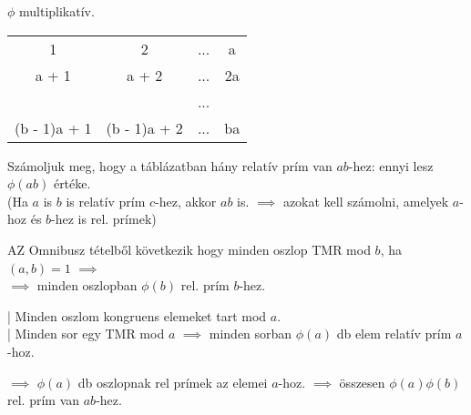 \begin{frame}
  \begin{tcolorbox}[title={Tétel: $\phi$ multiplikativitása}]
  $\phi$ multiplikatív.
  \tcblower
    \mmedskip

    \begin{tabular}{c c c c}
    1 & 2 & ... & a \\
    a + 1 & a + 2 & ... & 2a\\
     &  & ... &  \\
    (b - 1)a + 1 & (b - 1)a + 2 & ... & ba
    \end{tabular}
    \mmedskip

    Számoljuk meg, hogy a táblázatban hány relatív prím van $ab$-hez: ennyi lesz ${\phi}(ab)$ értéke.\\
    (Ha $a$ is $b$ is relatív prím $c$-hez, akkor $ab$ is. $\implies$ azokat kell számolni, amelyek $a$-hoz és $b$-hez is rel. prímek)\\
    \msmallskip

    AZ Omnibusz tételből következik hogy minden oszlop TMR mod $b$, ha $(a, b) = 1$ $\implies$\\
    $\implies$ minden oszlopban ${\phi}(b)$ rel. prím $b$-hez.\\
    \msmallskip

    | Minden oszlom kongruens elemeket tart mod $a$.\\
    | Minden sor egy TMR mod $a$ $\implies$ minden sorban ${\phi}(a)$ db elem relatív prím $a$-hoz.\\
    \msmallskip
    
    $\implies$ ${\phi}(a)$ db oszlopnak rel prímek az elemei $a$-hoz. $\implies$ összesen ${\phi}(a){\phi}(b)$ rel. prím van $ab$-hez.
  \end{tcolorbox}
\end{frame}

